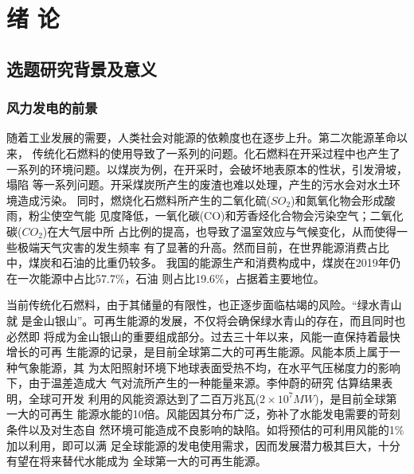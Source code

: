 \documentclass[AutoFakeBold]{LZUThesis}
\begin{document}
\tableofcontents


\mainmatter

\chapter{绪 \qquad 论}


\section{选题研究背景及意义}
\subsection{风力发电的前景}
随着工业发展的需要，人类社会对能源的依赖度也在逐步上升。第二次能源革命以来，
传统化石燃料的使用导致了一系列的问题。化石燃料在开采过程中也产生了
一系列的环境问题。以煤炭为例，在开采时，会破坏地表原本的性状，引发滑坡，塌陷
等一系列问题。开采煤炭所产生的废渣也难以处理，产生的污水会对水土环境造成污染。
同时，燃烧化石燃料所产生的二氧化硫($SO_2$)和氮氧化物会形成酸雨，粉尘使空气能
见度降低，一氧化碳(CO)和芳香烃化合物会污染空气；二氧化碳($CO_2$)在大气层中所
占比例的提高，也导致了温室效应与气候变化，从而使得一些极端天气灾害的发生频率
有了显著的升高。然而目前，在世界能源消费占比中，煤炭和石油的比重仍较多。
我国的能源生产和消费构成中，煤炭在2019年仍在一次能源中占比57.7\%，石油
则占比19.6\%，占据着主要地位。

当前传统化石燃料，由于其储量的有限性，也正逐步面临枯竭的风险。“绿水青山就
是金山银山”。可再生能源的发展，不仅将会确保绿水青山的存在，而且同时也必然即
将成为金山银山的重要组成部分。过去三十年以来，风能一直保持着最快增长的可再
生能源的记录，是目前全球第二大的可再生能源。风能本质上属于一种气象能源，其
为太阳照射环境下地球表面受热不均，在水平气压梯度力的影响下，由于温差造成大
气对流所产生的一种能量来源。李仲蔚的研究
估算结果表明，全球可开发
利用的风能资源达到了二百万兆瓦($2\times10^7MW$)，是目前全球第一大的可再生
能源水能的10倍。风能因其分布广泛，弥补了水能发电需要的苛刻条件以及对生态自
然环境可能造成不良影响的缺陷。如将预估的可利用风能的1\%加以利用，即可以满
足全球能源的发电使用需求，因而发展潜力极其巨大，十分有望在将来替代水能成为
全球第一大的可再生能源。
\end{document}
